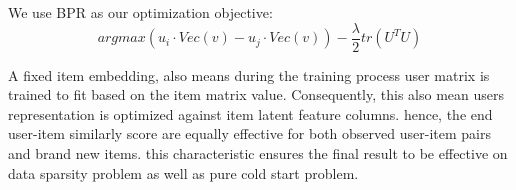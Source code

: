 We use BPR as our optimization objective:
\begin{equation}
    arg max (u_i \cdot Vec(v)-u_j \cdot Vec(v)) - \dfrac{\lambda}{2}tr(U^TU)
\end{equation}

A fixed item embedding, also means during the training process user matrix is trained to fit based on the item matrix value. Consequently, this also mean users representation is optimized against item latent feature columns. hence, the end user-item similarly score are equally effective for both observed user-item pairs and brand new items. this characteristic ensures the final result to be effective on data sparsity problem as well as pure cold start problem.
